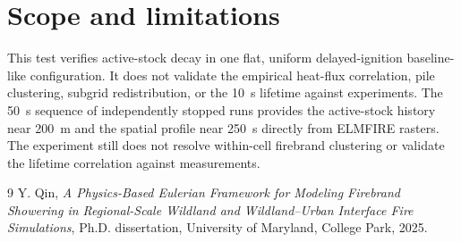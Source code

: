 \section{Scope and limitations}
This test verifies active-stock decay in one flat, uniform delayed-ignition baseline-like
configuration. It does not validate the empirical heat-flux correlation, pile
clustering, subgrid redistribution, or the 10~s lifetime against experiments.
The 50~s sequence of independently stopped runs provides the active-stock history near 200~m and
the spatial profile near 250~s directly from ELMFIRE rasters. The experiment
still does not resolve within-cell firebrand clustering or validate the lifetime
correlation against measurements.

\begin{thebibliography}{9}
Y. Qin, \emph{A Physics-Based Eulerian Framework for Modeling Firebrand
Showering in Regional-Scale Wildland and Wildland--Urban Interface Fire
Simulations}, Ph.D. dissertation, University of Maryland, College Park, 2025.
\end{thebibliography}
